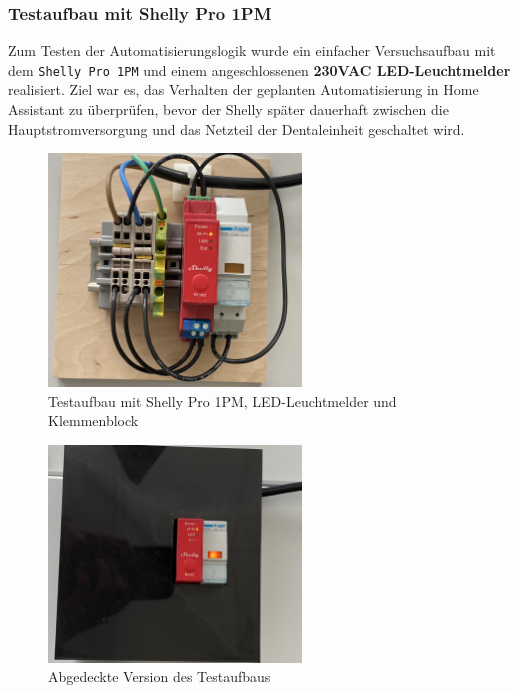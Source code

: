 \subsubsection{Testaufbau mit Shelly Pro 1PM}

Zum Testen der Automatisierungslogik wurde ein einfacher Versuchsaufbau mit dem \texttt{Shelly Pro 1PM} und einem angeschlossenen \textbf{230VAC LED-Leuchtmelder} realisiert. Ziel war es, das Verhalten der geplanten Automatisierung in Home Assistant zu überprüfen, bevor der Shelly später dauerhaft zwischen die Hauptstromversorgung und das Netzteil der Dentaleinheit geschaltet wird.

\begin{figure}[H]
  \centering
  \includegraphics[width=0.6\textwidth]{images/shelly_aufbau1.jpeg}
  \caption{Testaufbau mit Shelly Pro 1PM, LED-Leuchtmelder und Klemmenblock}
  \label{fig:shelly-aufbau1}
\end{figure}

\begin{figure}[H]
  \centering
  \includegraphics[width=0.6\textwidth]{images/shelly_aufbau2.jpeg}
  \caption{Abgedeckte Version des Testaufbaus}
  \label{fig:shelly-aufbau2}
\end{figure}

